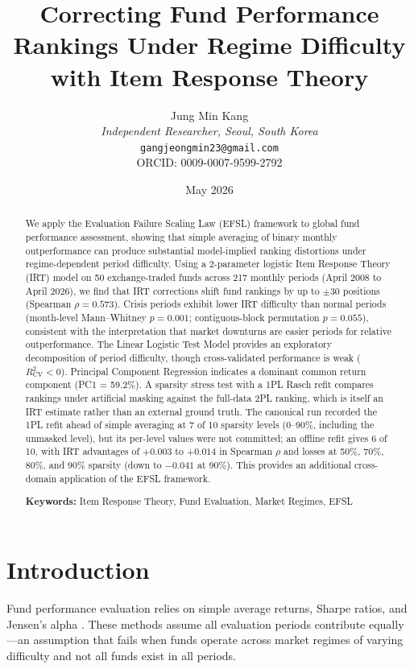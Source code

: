 \documentclass[11pt,a4paper]{article}
\title{Correcting Fund Performance Rankings Under Regime Difficulty\\with Item Response Theory}
\author{Jung Min Kang\\\textit{Independent Researcher, Seoul, South Korea}\\\texttt{gangjeongmin23@gmail.com}\\ORCID: 0009-0007-9599-2792}
\date{May 2026}
\begin{document}
\maketitle

\begin{abstract}
We apply the Evaluation Failure Scaling Law (EFSL) framework to global fund performance assessment, showing that simple averaging of binary monthly outperformance can produce substantial model-implied ranking distortions under regime-dependent period difficulty. Using a 2-parameter logistic Item Response Theory (IRT) model on 50 exchange-traded funds across 217 monthly periods (April 2008 to April 2026), we find that IRT corrections shift fund rankings by up to $\pm$30 positions (Spearman $\rho = 0.573$). Crisis periods exhibit lower IRT difficulty than normal periods (month-level Mann--Whitney $p = 0.001$; contiguous-block permutation $p = 0.055$), consistent with the interpretation that market downturns are easier periods for relative outperformance. The Linear Logistic Test Model provides an exploratory decomposition of period difficulty, though cross-validated performance is weak ($R^2_{\text{CV}} < 0$). Principal Component Regression indicates a dominant common return component (PC1 = 59.2\%). A sparsity stress test with a 1PL Rasch refit compares rankings under artificial masking against the full-data 2PL ranking, which is itself an IRT estimate rather than an external ground truth. The canonical run recorded the 1PL refit ahead of simple averaging at 7 of 10 sparsity levels (0--90\%, including the unmasked level), but its per-level values were not committed; an offline refit gives 6 of 10, with IRT advantages of $+0.003$ to $+0.014$ in Spearman $\rho$ and losses at 50\%, 70\%, 80\%, and 90\% sparsity (down to $-0.041$ at 90\%). This provides an additional cross-domain application of the EFSL framework.

\medskip\noindent\textbf{Keywords:} Item Response Theory, Fund Evaluation, Market Regimes, EFSL
\end{abstract}

\section{Introduction}

Fund performance evaluation relies on simple average returns, Sharpe ratios, and Jensen's alpha \citep{sharpe1966,jensen1968}. These methods assume all evaluation periods contribute equally---an assumption that fails when funds operate across market regimes of varying difficulty and not all funds exist in all periods.
\end{document}
